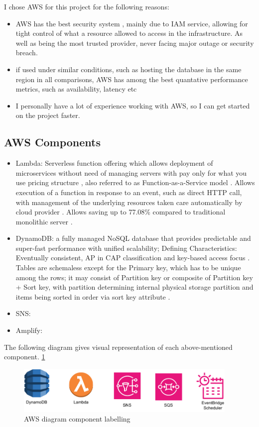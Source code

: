 I chose AWS for this project for the following reasons:
\begin{itemize}
    \item{AWS has the best security system \cite{Narula2015Cloud}, mainly due to IAM service, allowing for tight control of what a resource allowed to access in the infrastructure. As well as being the most trusted provider, never facing major outage or security breach. }
    \item{if used under similar conditions, such as hosting the database in the same region in all comparisons, AWS has among the best quantative performance metrics, such as availability, latency etc \cite{CloudMetrics}  }
    \item {I personally have a lot of experience working with AWS, so I can get started on the project faster.}
\end{itemize}
\subsection{AWS Components}
\begin{itemize}
    \item Lambda: Serverless function offering which allows deployment of microservices without need of managing servers with pay only for what you use pricing structure \cite{LambdaCostSave}, also referred to as Function-as-a-Service model \cite{MALAWSKI2020502}. Allows execution of a function in response to an event, such as direct HTTP call, with management of the underlying resources taken care automatically by cloud provider \cite{MALAWSKI2020502}.  Allows saving up to 77.08\% compared to traditional monolithic server \cite{LambdaCostSave}.
    \item DynamoDB: a fully managed NoSQL database that provides predictable and super-fast performance with unified scalability; Defining Characteristics: Eventually consistent, AP in CAP classification and key-based access focus \cite{DynamoDB}. Tables are schemaless except for the Primary key, which has to be unique among the rows; it may consist of Partition key or composite of Partition key + Sort key, with partition determining internal physical storage partition and items being sorted in order via sort key attribute \cite{awsDynamoWebsite}. 
    \item SNS: 
    \item Amplify:
\end{itemize}
The following diagram gives visual representation of each above-mentioned component. \ref{fig:awsComponents}
\begin{figure}
    
    \centering
    \includegraphics[width=0.95\textwidth,keepaspectratio]{../images/AWS_components.pdf}
    \caption{AWS diagram component labelling}
    \label{fig:awsComponents}
\end{figure}

